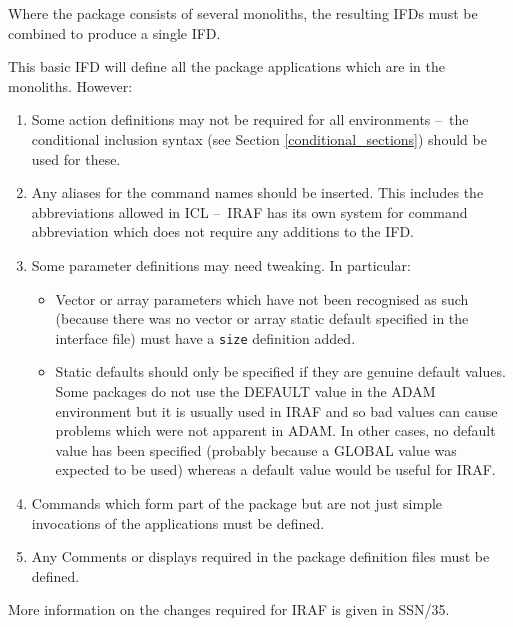 \documentclass[twoside,11pt]{article}
\newcommand{\htmlref}[2]{#1}
\newcommand{\xref}[3]{#1}
\newcommand{\latex}[1]{#1}
\newcommand{\dash}{--}
\newcommand{\dash}{-}
\begin{document}
Where the package consists of several monoliths, the resulting IFDs must be
combined to produce a single IFD.

This basic IFD will define all the package applications which are in the
monoliths. However:
\begin{enumerate}
\item Some action definitions may not be required for all environments 
\dash\ the 
\htmlref{conditional inclusion}{conditional_sections}
syntax
\latex{(see Section \ref{conditional_sections})} should be used for these.
\item Any 
\htmlref{aliases}{alias}
for the command names should be inserted. This includes the abbreviations
allowed in 
\xref{ICL}{sg5}{} \dash\ IRAF has its own system for command abbreviation which
does not require any additions to the IFD.
\item Some parameter definitions may need tweaking. In particular:
\begin{itemize}
\item Vector or array parameters which have not been recognised as such 
(because there was no vector or array static default specified in the 
interface file) must have a
\htmlref{\texttt{size}}{size}
definition added.
\item Static defaults should only be specified if they are genuine default
values. Some packages do not use the DEFAULT value in the ADAM environment
but it is usually used in IRAF and so bad values can cause problems which
were not apparent in ADAM. In other cases, no default value has been
specified (probably because a GLOBAL value was expected to be used) whereas
a default value would be useful for IRAF.
\end{itemize}
\item Commands which form part of the package but are not just simple 
invocations of the applications must be defined.
\item Any
\htmlref{Comments}{comment}
or
\htmlref{displays}{display}
required in the package definition files must be defined.
\end{enumerate}
More information on the changes required for IRAF is given in
\xref{SSN/35}{ssn35}{}.
\end{document}
